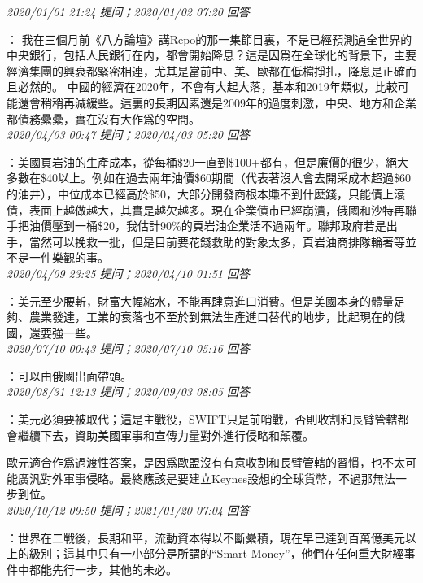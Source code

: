 \documentclass[twocolumn]{ctexart}
\begin{document}
\textit{\hfill\noindent\small 2020/01/01 21:24 提问；2020/01/02 07:20 回答}

：
我在三個月前《八方論壇》講Repo的那一集節目裏，不是已經預測過全世界的中央銀行，包括人民銀行在内，都會開始降息？這是因爲在全球化的背景下，主要經濟集團的興衰都緊密相連，尤其是當前中、美、歐都在低檔掙扎，降息是正確而且必然的。
中國的經濟在2020年，不會有大起大落，基本和2019年類似，比較可能還會稍稍再減緩些。這裏的長期因素還是2009年的過度刺激，中央、地方和企業都債務纍纍，實在沒有大作爲的空間。
\\

\textit{\hfill\noindent\small 2020/04/03 00:47 提问；2020/04/03 05:20 回答}

：美國頁岩油的生產成本，從每桶\$20一直到\$100+都有，但是廉價的很少，絕大多數在\$40以上。例如在過去兩年油價\$60期間（代表著沒人會去開采成本超過\$60的油井），中位成本已經高於\$50，大部分開發商根本賺不到什麽錢，只能債上滾債，表面上越做越大，其實是越欠越多。現在企業債市已經崩潰，俄國和沙特再聯手把油價壓到一桶\$20，我估計90\%的頁岩油企業活不過兩年。聯邦政府若是出手，當然可以挽救一批，但是目前要花錢救助的對象太多，頁岩油商排隊輪著等並不是一件樂觀的事。
\\

\textit{\hfill\noindent\small 2020/04/09 23:25 提问；2020/04/10 01:51 回答}

：美元至少腰斬，財富大幅縮水，不能再肆意進口消費。但是美國本身的體量足夠、農業發達，工業的衰落也不至於到無法生產進口替代的地步，比起現在的俄國，還要強一些。
\\

\textit{\hfill\noindent\small 2020/07/10 00:43 提问；2020/07/10 05:16 回答}

：可以由俄國出面帶頭。
\\

\textit{\hfill\noindent\small 2020/08/31 12:13 提问；2020/09/03 08:05 回答}

：美元必須要被取代；這是主戰役，SWIFT只是前哨戰，否則收割和長臂管轄都會繼續下去，資助美國軍事和宣傳力量對外進行侵略和顛覆。

歐元適合作爲過渡性答案，是因爲歐盟沒有有意收割和長臂管轄的習慣，也不太可能廣汎對外軍事侵略。最終應該是要建立Keynes設想的全球貨幣，不過那無法一步到位。
\\

\textit{\hfill\noindent\small 2020/10/12 09:50 提问；2021/01/20 07:04 回答}

：世界在二戰後，長期和平，流動資本得以不斷纍積，現在早已達到百萬億美元以上的級別；這其中只有一小部分是所謂的“Smart Money”，他們在任何重大財經事件中都能先行一步，其他的未必。
\\
\end{document}

